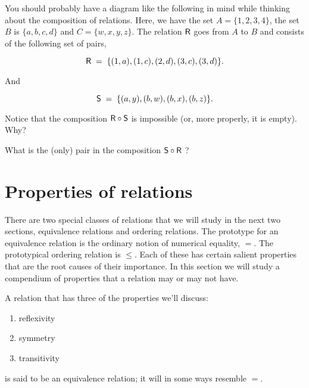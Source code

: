  
You should probably have a diagram like the following in mind while thinking
about the composition of relations.  Here, we have the set $A=\{1,2,3,4\}$,
the set $B$ is $\{a,b,c,d\}$ and $C=\{w,x,y,z\}$.  The relation
$\mbox{\textsf R}$ goes from $A$ to $B$ and consists of the following set of pairs,

\[ \mbox{\textsf R} \; = \; \{(1,a), (1,c), (2,d), (3,c), (3,d) \}. \]

And 

\[ \mbox{\textsf S} \; = \; \{(a,y), (b,w), (b,x), (b,z) \}. \]

\vfill



\begin{exer}
Notice that the composition $\mbox{\textsf R} \circ \mbox{\textsf S}$ is impossible (or, more
properly, it is empty).  Why?

What is the (only) pair in the composition $\mbox{\textsf S} \circ \mbox{\textsf R}$ ?
\end{exer}

\newpage





\newpage

\section{Properties of relations}
\label{sec:rel_props}

There are two special classes of relations that we will study
in the next two sections, equivalence relations and ordering relations.
The prototype for an equivalence relation is the ordinary notion
of numerical equality, $=$.  The prototypical ordering relation
is $\leq$.  Each of these has certain salient properties that are the
root causes of their importance.  In this section we will study a 
compendium of properties that a relation may or may not have.  

A relation that has three of the properties we'll discuss:

\begin{enumerate}
\item {} reflexivity 
\item {}symmetry 
\item {}transitivity
\end{enumerate}

\noindent is said to be an equivalence relation; it will in some ways resemble
$=$.

